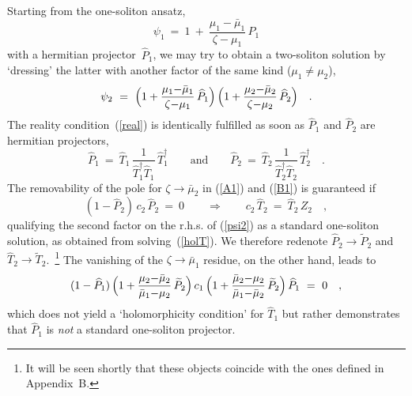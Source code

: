 \documentclass[a4paper,11pt]{article}
\numberwithin{equation}{section}
\newcommand{\Tt}{\widetilde{T}}
\newcommand{\Pt}{\widetilde{P}}
\newcommand{\Th}{\widehat{T}}
\newcommand{\Ph}{\widehat{P}}
\begin{document}
Starting from the one-soliton ansatz,
\begin{equation}
\psi_1\ =\ 1\ +\ \frac{\mu_1{-}\bar\mu_1}{\zeta{-}\mu_1}\,\Ph_1 
\end{equation}
with a hermitian projector~$\Ph_1$,
we may try to obtain a two-soliton solution by `dressing' the latter with
another factor of the same kind ($\mu_1\neq\mu_2$),
\begin{equation} \label{psi2}
\psi_2\ =\ \Bigl( 1+\frac{\mu_1{-}\bar\mu_1}{\zeta{-}\mu_1}\,\Ph_1 \Bigr)\,
           \Bigl( 1+\frac{\mu_2{-}\bar\mu_2}{\zeta{-}\mu_2}\,\Ph_2 \Bigr)\quad.
\end{equation}
The reality condition~(\ref{real}) is identically fulfilled as soon as
$\Ph_1$ and $\Ph_2$ are hermitian projectors,
\begin{equation}
\Ph_1\ =\ \Th_1\,\frac{1}{\Th_1^\dagger\Th_1}\,\Th_1^\dagger
\qquad\textrm{and}\qquad
\Ph_2\ =\ \Th_2\,\frac{1}{\Th_2^\dagger\Th_2}\,\Th_2^\dagger \quad.
\end{equation}
The removability of the pole for $\zeta\to\bar\mu_2$ in (\ref{A1}) and
(\ref{B1}) is guaranteed if
\begin{equation} \label{hatequation}
(1-\Ph_2)\,c_2\,\Ph_2\ =\ 0
\qquad\Longrightarrow\qquad
c_2\,\Th_2\ =\ \Th_2\,Z_2 \quad,
\end{equation}
qualifying the second factor on the r.h.s. of (\ref{psi2}) 
as a standard one-soliton solution, as obtained from solving~(\ref{holT}).
We therefore redenote $\Ph_2\to\Pt_2$ and $\Th_2\to\Tt_2$.~\footnote{
It will be seen shortly that these objects coincide with the ones defined
in Appendix~B.}
The vanishing of the $\zeta\to\bar\mu_1$ residue, on the other hand, leads to
\begin{equation} \label{Ph1equation}
(1-\Ph_1)\,\Bigl(1+\frac{\mu_2{-}\bar\mu_2}{\bar\mu_1{-}\mu_2}\,\Pt_2\Bigr)\,
c_1\,\Bigl(1+\frac{\bar\mu_2{-}\mu_2}{\bar\mu_1{-}\bar\mu_2}\,\Pt_2\Bigr)\,\Ph_1
\ =\ 0 \quad,
\end{equation}
which does not yield a `holomorphicity condition' for $\Th_1$ but rather 
demonstrates that $\Ph_1$ is {\it not\/} a standard one-soliton projector.
\end{document}
